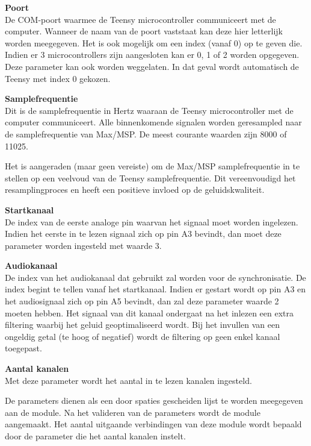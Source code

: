 \begin{description}	
	\item\textbf{Poort} \hfill \\
	De COM-poort waarmee de Teensy microcontroller communiceert met de computer. Wanneer de naam van de poort vaststaat kan deze hier letterlijk worden meegegeven. Het is ook mogelijk om een index (vanaf 0) op te geven die. Indien er 3 microcontrollers zijn aangesloten kan er 0, 1 of 2 worden opgegeven. Deze parameter kan ook worden weggelaten. In dat geval wordt automatisch de Teensy met index 0 gekozen.
	\item\textbf{Samplefrequentie} \hfill \\
	Dit is de samplefrequentie in Hertz waaraan de Teensy microcontroller met de computer communiceert. Alle binnenkomende signalen worden geresampled naar de samplefrequentie van Max/MSP. De meest courante waarden zijn 8000 of 11025. 
	
	Het is aangeraden (maar geen vereiste) om de Max/MSP samplefrequentie in te stellen op een veelvoud van de Teensy samplefrequentie. Dit vereenvoudigd het resamplingproces en heeft een positieve invloed op de geluidskwaliteit.
	
	\item\textbf{Startkanaal} \hfill \\
	De index van de eerste analoge pin waarvan het signaal moet worden ingelezen. Indien het eerste in te lezen signaal zich op pin A3 bevindt, dan moet deze parameter worden ingesteld met waarde 3.
	
	\item\textbf{Audiokanaal} \hfill \\
	De index van het audiokanaal dat gebruikt zal worden voor de synchronisatie. De index begint te tellen vanaf het startkanaal. Indien er gestart wordt op pin A3 en het audiosignaal zich op pin A5 bevindt, dan zal deze parameter waarde 2 moeten hebben. Het signaal van dit kanaal ondergaat na het inlezen een extra filtering waarbij het geluid geoptimaliseerd wordt. Bij het invullen van een ongeldig getal (te hoog of negatief) wordt de filtering op geen enkel kanaal toegepast.

	\item\textbf{Aantal kanalen} \hfill \\
	Met deze parameter wordt het aantal in te lezen kanalen ingesteld.
\end{description}

De parameters dienen als een door spaties gescheiden lijst te worden meegegeven aan de module. Na het valideren van de parameters wordt de module aangemaakt. Het aantal uitgaande verbindingen van deze module wordt bepaald door de parameter die het aantal kanalen instelt.

